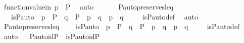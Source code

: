 \begin{isabellebody}
\ function{\isacharunderscore}{\kern0pt}value{\isacharunderscore}{\kern0pt}in\ {\isacartoucheopen}p\ {\isasymin}\ P{\isacartoucheclose}\ \isamarkupfalse%
\ auto\ \isanewline
{}\isamarkupfalse%
%
\endisatagproof
{\isafoldproof}%
%
\isadelimproof
\ \isanewline
%
\endisadelimproof
\ \ \isanewline
{}\isamarkupfalse%
\ P{\isacharunderscore}{\kern0pt}auto{\isacharunderscore}{\kern0pt}preserves{\isacharunderscore}{\kern0pt}leq\ {\isacharcolon}{\kern0pt}\ \isanewline
\ \ \ {\isachardoublequoteopen}is{\isacharunderscore}{\kern0pt}P{\isacharunderscore}{\kern0pt}auto{\isacharparenleft}{\kern0pt}{\isasympi}{\isacharparenright}{\kern0pt}\ {\isasymLongrightarrow}\ p\ {\isasymin}\ P\ {\isasymLongrightarrow}\ q\ {\isasymin}\ P\ {\isasymLongrightarrow}\ p\ {\isasympreceq}\ q\ {\isasymLongrightarrow}\ {\isasympi}{\isacharbackquote}{\kern0pt}p\ {\isasympreceq}\ {\isasympi}{\isacharbackquote}{\kern0pt}q{\isachardoublequoteclose}\ \isanewline
%
\isadelimproof
\ \ %
\endisadelimproof
%
\isatagproof
{}\isamarkupfalse%
\ is{\isacharunderscore}{\kern0pt}P{\isacharunderscore}{\kern0pt}auto{\isacharunderscore}{\kern0pt}def\ \isamarkupfalse%
\ auto%
\endisatagproof
{\isafoldproof}%
%
\isadelimproof
\ \isanewline
%
\endisadelimproof
\isanewline
{}\isamarkupfalse%
\ P{\isacharunderscore}{\kern0pt}auto{\isacharunderscore}{\kern0pt}preserves{\isacharunderscore}{\kern0pt}leq{\isacharprime}{\kern0pt}\ {\isacharcolon}{\kern0pt}\ \isanewline
\ \ {\isachardoublequoteopen}is{\isacharunderscore}{\kern0pt}P{\isacharunderscore}{\kern0pt}auto{\isacharparenleft}{\kern0pt}{\isasympi}{\isacharparenright}{\kern0pt}\ {\isasymLongrightarrow}\ p\ {\isasymin}\ P\ {\isasymLongrightarrow}\ q\ {\isasymin}\ P\ {\isasymLongrightarrow}\ {\isasympi}{\isacharbackquote}{\kern0pt}p\ {\isasympreceq}\ {\isasympi}{\isacharbackquote}{\kern0pt}q\ {\isasymLongrightarrow}\ p\ {\isasympreceq}\ q{\isachardoublequoteclose}\ \isanewline
%
\isadelimproof
\ \ %
\endisadelimproof
%
\isatagproof
{}\isamarkupfalse%
\ is{\isacharunderscore}{\kern0pt}P{\isacharunderscore}{\kern0pt}auto{\isacharunderscore}{\kern0pt}def\ \isamarkupfalse%
\ auto%
\endisatagproof
{\isafoldproof}%
%
\isadelimproof
\ \isanewline
%
\endisadelimproof
\isanewline
{}\isamarkupfalse%
\ P{\isacharunderscore}{\kern0pt}auto{\isacharunderscore}{\kern0pt}idP\ {\isacharcolon}{\kern0pt}\ {\isachardoublequoteopen}is{\isacharunderscore}{\kern0pt}P{\isacharunderscore}{\kern0pt}auto{\isacharparenleft}{\kern0pt}id{\isacharparenleft}{\kern0pt}P{\isacharparenright}{\kern0pt}{\isacharparenright}{\kern0pt}{\isachardoublequoteclose}\isanewline

\end{isabellebody}
